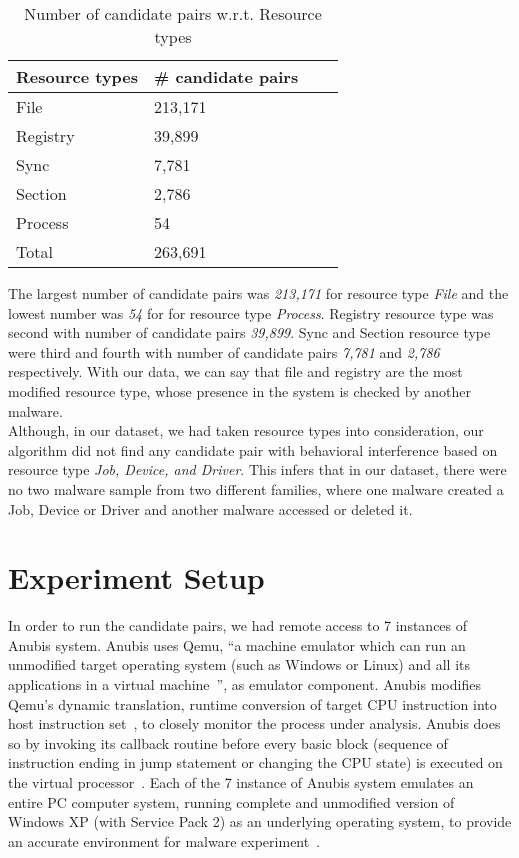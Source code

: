 \begin{table}[ht]
  \caption[Number of probable candidate pairs w.r.t. Resource types]{Number of candidate pairs w.r.t. Resource types}\label{tab:totalcandidates}
  \centering
  \begin{tabular}{l l l l}
    \toprule
    Resource types & \# candidate pairs\\
    \midrule
    File & 213,171 \\
    Registry & 39,899 \\
    Sync & 7,781 \\
    Section & 2,786 \\
    Process & 54\\
    \bottomrule
    Total & 263,691\\
  \end{tabular}
\end{table}
The largest number of candidate pairs was \emph{213,171} for resource type \emph{File} and the lowest number was \emph{54} for for resource type \emph{Process}.
Registry resource type was second with number of candidate pairs \emph{39,899}.
Sync and Section resource type were third and fourth with number of candidate pairs \emph{7,781} and \emph{2,786} respectively.
With our data, we can say that file and registry are the most modified resource type, whose presence in the system is checked by another malware.\\

Although, in our dataset, we had taken resource types {\getresourcetypes{}} into consideration, our algorithm did not find any candidate pair with behavioral interference based on resource type \emph{Job, Device, and Driver}.
This infers that in our dataset, there were no two malware sample from two different families, where one malware created a Job, Device or Driver and another malware accessed or deleted it.
\section{Experiment Setup}
\label{sec:Experiment Setup}
In order to run the candidate pairs, we had remote access to 7 instances of Anubis system.
Anubis uses Qemu, ``a machine emulator which can run an unmodified target operating system (such as Windows or Linux) and all its applications in a virtual machine~\cite[]{qemu}'', as emulator component.
Anubis modifies Qemu's dynamic translation, runtime conversion of target CPU instruction into host instruction set~\cite[]{qemu}, to closely monitor the process under analysis.
Anubis does so by invoking its callback routine before every basic block (sequence of instruction ending in jump statement or changing the CPU state) is executed on the virtual processor~\cite[]{ttanalyze}.
Each of the 7 instance of Anubis system emulates an entire PC computer system, running complete and unmodified version of Windows XP (with Service Pack 2) as an underlying operating system, to provide an accurate environment for malware experiment~\cite[]{ttanalyze}.
\\

